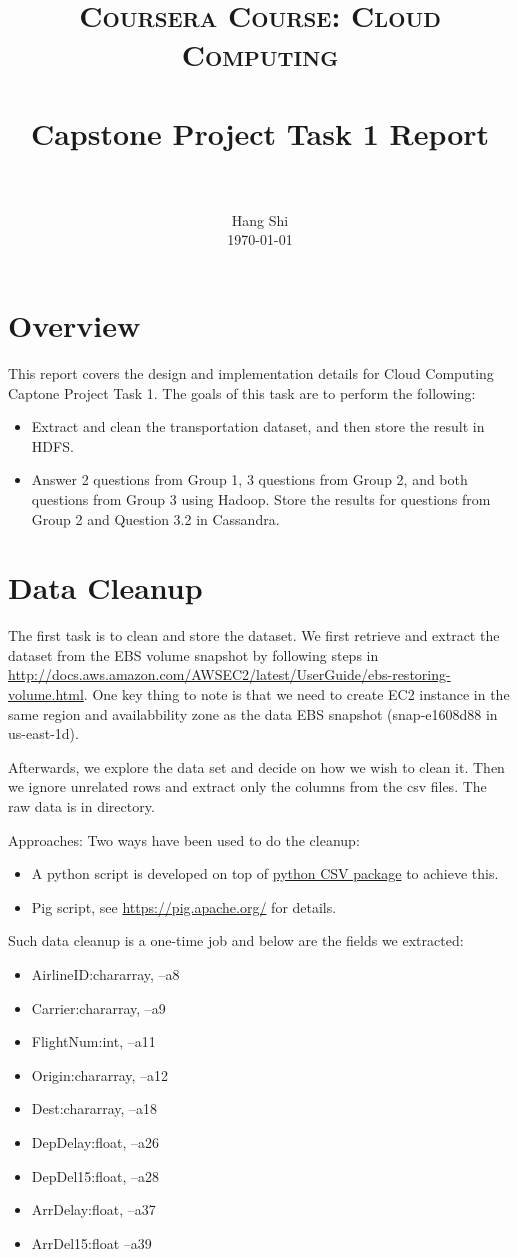 \documentclass[fontsize=11pt,paper=a4]{scrartcl}
\title{
		\usefont{OT1}{bch}{b}{n}
		\normalfont \normalsize \textsc
		{Coursera Course: Cloud Computing} \\ [25pt]
		\horrule{0.5pt} \\[0.4cm]
		\huge Capstone Project Task 1 Report \\
		\horrule{2pt} \\[0.5cm]
}
\author{
		\normalfont 	\normalsize
        Hang Shi\\[-3pt] \normalsize
        \today
}
\date{}
\begin{document}
\maketitle


\section{Overview}
This report covers the design and implementation details for Cloud Computing Captone Project Task 1. The goals of this task are to perform the following:
\begin{itemize}
\item Extract and clean the transportation dataset, and then store the result in HDFS.
\item Answer 2 questions from Group 1, 3 questions from Group 2, and both questions from Group 3 using Hadoop. Store the results for questions from Group 2 and Question 3.2 in Cassandra.   
\end{itemize}
 
\section{Data Cleanup}
The first task is to clean and store the dataset. We  first retrieve and extract the dataset from the EBS volume snapshot by following steps in \url{http://docs.aws.amazon.com/AWSEC2/latest/UserGuide/ebs-restoring-volume.html}. One key thing to note is that we need to create EC2 instance in the same region and availabbility zone as the data EBS snapshot (snap-e1608d88 in us-east-1d).   

Afterwards, we explore the data set and decide on how we wish to clean it. Then we ignore unrelated rows and extract only the columns from the csv files. The raw data is in  directory. 

Approaches: Two ways have been used to do the cleanup: 
\begin{itemize} 
\item A python script is developed on top of \href{https://docs.python.org/2/library/csv.html}{python CSV package} to achieve this. 
\item Pig script, see \url{https://pig.apache.org/} for details. 
\end{itemize}

 Such data cleanup is a one-time job and below are the fields we extracted: 
\begin{itemize}
\item       AirlineID:chararray, --a8
\item       Carrier:chararray,   --a9
\item       FlightNum:int,       --a11
\item       Origin:chararray,    --a12       
\item       Dest:chararray,      --a18
\item       DepDelay:float,      --a26
\item       DepDel15:float,      --a28
\item       ArrDelay:float,      --a37 
\item       ArrDel15:float       --a39
\end{itemize}
\end{document}
